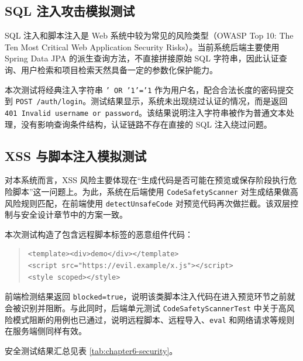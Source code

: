 \subsection{SQL 注入攻击模拟测试}
SQL 注入和脚本注入是 Web 系统中较为常见的风险类型（OWASP Top 10: The Ten Most Critical Web Application Security Risks）\cite{owasp2021top10}。当前系统后端主要使用 Spring Data JPA 的派生查询方法，不直接拼接原始 SQL 字符串，因此认证查询、用户检索和项目检索天然具备一定的参数化保护能力。

本次测试将经典注入字符串 \texttt{' OR '1'='1} 作为用户名，配合合法长度的密码提交到 \texttt{POST /auth/login}。测试结果显示，系统未出现绕过认证的情况，而是返回 \texttt{401 Invalid username or password}。该结果说明注入字符串被作为普通文本处理，没有影响查询条件结构，认证链路不存在直接的 SQL 注入绕过问题。

\subsection{XSS 与脚本注入模拟测试}
对本系统而言，XSS 风险主要体现在“生成代码是否可能在预览或保存阶段执行危险脚本”这一问题上。为此，系统在后端使用 \texttt{CodeSafetyScanner} 对生成结果做高风险规则匹配，在前端使用 \texttt{detectUnsafeCode} 对预览代码再次做拦截。该双层控制与安全设计章节中的方案一致。

本次测试构造了包含远程脚本标签的恶意组件代码：
\begin{quote}
\small
\begin{verbatim}
<template><div>demo</div></template>
<script src="https://evil.example/x.js"></script>
<style scoped></style>
\end{verbatim}
\end{quote}

前端检测结果返回 \texttt{blocked=true}，说明该类脚本注入代码在进入预览环节之前就会被识别并阻断。与此同时，后端单元测试 \texttt{CodeSafetyScannerTest} 中关于高风险模式阻断的用例也已通过，说明远程脚本、远程导入、\texttt{eval} 和网络请求等规则在服务端侧同样有效。

安全测试结果汇总见表 \ref{tab:chapter6-security}。

